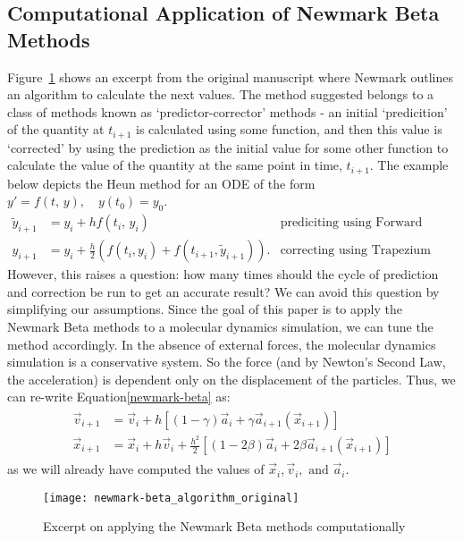 \documentclass[../Main.tex]{subfiles}
\begin{document}
\subsection{Computational Application of Newmark Beta Methods} \label{numerical-newmark-beta}
Figure~\ref{fig:newmark-beta_algorithm_original} shows an excerpt from the original manuscript \cite{Newmark1959} where Newmark outlines an algorithm to calculate the next values. The method suggested belongs to a class of methods known as `predictor-corrector' methods - an initial `predicition' of the quantity at $t_{i+1}$ is calculated using some function, and then this value is `corrected' by using the prediction as the initial value for some other function to calculate the value of the quantity at the same point in time, $t_{i+1}$. The example below depicts the Heun method for an ODE of the form $y' = f\left(t\mbox{, }y\right), \quad y\left(t_{0}\right) = y_{0}$.
\begin{align*}
	\tilde{y}_{i+1} & = y_{i} + hf\left(t_{i}\mbox{, }y_{i}\right) & \mbox{prediciting using Forward Euler Method} \\
	y_{i+1} & = y_{i} + \frac{h}{2}\left(f\left(t_{i}, y_{i}\right) + f\left(t_{i+1}, \tilde{y}_{i+1}\right)\right). & \mbox{correcting using Trapezium Rule}
\end{align*}
However, this raises a question: how many times should the cycle of prediction and correction be run to get an accurate result? We can avoid this question by simplifying our assumptions. Since the goal of this paper is to apply the Newmark Beta methods to a molecular dynamics simulation, we can tune the method accordingly. In the absence of external forces, the molecular dynamics simulation is a conservative system. So the force (and by Newton's Second Law, the acceleration) is dependent only on the displacement of the particles. Thus, we can re-write Equation\ref{newmark-beta} as:
\begin{align*}
	\begin{split}
		\vec{v}_{i+1} & = \vec{v}_{i} + h\left[\left(1-\gamma\right)\vec{a}_{i} + \gamma\vec{a}_{i+1}\left(\vec{x}_{i+1}\right)\right] \\
		\vec{x}_{i+1} & = \vec{x}_{i} + h\vec{v}_{i} + \frac{h^2}{2}\left[\left(1-2\beta \right)\vec{a}_{i} + 2\beta\vec{a}_{i+1}\left(\vec{x}_{i+1}\right)\right] 
	\end{split}
\end{align*}
as we will already have computed the values of $\vec{x}_{i}, \vec{v}_{i},\mbox{ and }\vec{a}_{i}$.
\begin{figure}[h]
\texttt{[image: newmark-beta\_algorithm\_original]}
\centering
\caption{Excerpt on applying the Newmark Beta methods computationally}
\label{fig:newmark-beta_algorithm_original}
\end{figure}
\end{document}
